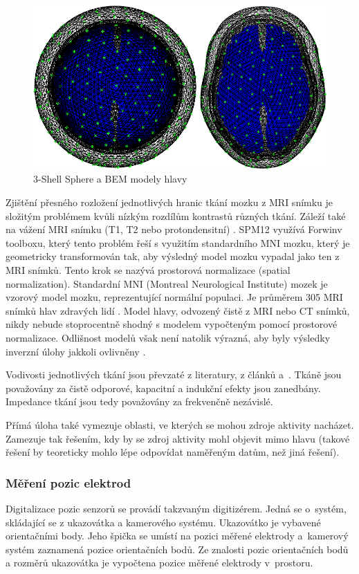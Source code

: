 \begin{figure}[!h]
\includegraphics[width=1.0\textwidth]{casti/teorie/modely.png}
\caption{3-Shell Sphere a BEM modely hlavy}
\label{3-shell-sphere}
\end{figure}

Zjištění přesného rozložení jednotlivých hranic tkání mozku z MRI snímku je složitým problémem kvůli nízkým rozdílům kontrastů různých tkání. Záleží také na vážení MRI snímku (T1, T2 nebo protondensitní) \cite{24}. SPM12 využívá Forwinv toolboxu, který tento problém řeší s využitím standardního MNI mozku, který je geometricky transformován tak, aby výsledný model mozku vypadal jako ten z MRI snímků. Tento krok se nazývá prostorová normalizace (spatial normalization). Standardní MNI (Montreal Neurological Institute) mozek je vzorový model mozku, reprezentující normální populaci. Je průměrem 305 MRI snímků hlav zdravých lidí \cite{69}. Model hlavy, odvozený čistě z MRI nebo CT snímků, nikdy nebude stoprocentně shodný s modelem vypočteným pomocí prostorové normalizace. Odlišnost modelů však není natolik výrazná, aby byly výsledky inverzní úlohy jakkoli ovlivněny \cite{24}.

Vodivosti jednotlivých tkání jsou převzaté z literatury, z článků \cite{26} \cite{27} a~\cite{21}. Tkáně jsou považovány za čistě odporové, kapacitní a indukční efekty jsou zanedbány. Impedance tkání jsou tedy považovány za frekvenčně nezávislé. \cite{22} 

Přímá úloha také vymezuje oblasti, ve kterých se mohou zdroje aktivity nacházet. Zamezuje tak řešením, kdy by se zdroj aktivity mohl objevit mimo hlavu (takové řešení by teoreticky mohlo lépe odpovídat naměřeným datům, než jiná řešení). \cite{29}

\subsubsection{Měření pozic elektrod}
Digitalizace pozic senzorů se provádí takzvaným digitizérem. Jedná se o~systém, skládající se z ukazovátka a kamerového systému. Ukazovátko je vybavené orientačními body. Jeho špička se umístí na pozici měřené elektrody a~kamerový systém zaznamená pozice orientačních bodů. Ze znalosti pozic orientačních bodů a rozměrů ukazovátka je vypočtena pozice měřené elektrody v~prostoru.

